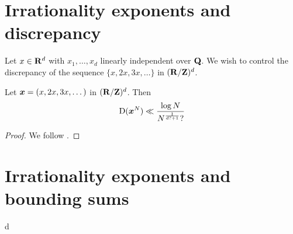 \section{Irrationality exponents and discrepancy}

Let $x\in \mathbf{R}^d$ with $x_1,\dots,x_d$ linearly independent over $\mathbf{Q}$. We wish 
to control the discrepancy of the sequence $\{x,2x,3x,\dots\}$ in 
$(\mathbf{R}/\mathbf{Z})^d$. 

\begin{theorem}
Let ${\boldsymbol x}=(x,2x,3x,\dots)$ in $(\mathbf{R}/\mathbf{Z})^d$. Then 
\[
	\operatorname{D}({\boldsymbol x}^N) \ll \frac{\log N}{N^{\frac{1}{d ? + 1}} ?}
\]
\end{theorem}
\begin{proof}
We follow \cite[Ch.~2, Ex.~3.15, 16, 17]{kuipers-niederreiter-1974}. 
\end{proof}





\section{Irrationality exponents and bounding sums}

d

